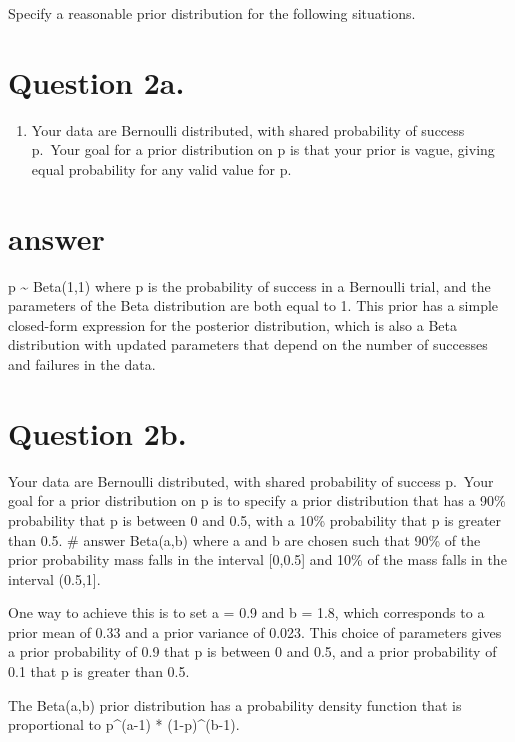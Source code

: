 \documentclass[
]{article}
\providecommand{\tightlist}{%
  \setlength{\itemsep}{0pt}\setlength{\parskip}{0pt}}
\begin{document}
Specify a reasonable prior distribution for the following situations.

\hypertarget{question-2a.}{%
\section{Question 2a.}\label{question-2a.}}

\begin{enumerate}
\def\labelenumi{\alph{enumi}.}
\tightlist
\item
  Your data are Bernoulli distributed, with shared probability of
  success p.~Your goal for a prior distribution on p is that your prior
  is vague, giving equal probability for any valid value for p.~
\end{enumerate}

\hypertarget{answer}{%
\section{answer}\label{answer}}

p \textasciitilde{} Beta(1,1) where p is the probability of success in a
Bernoulli trial, and the parameters of the Beta distribution are both
equal to 1. This prior has a simple closed-form expression for the
posterior distribution, which is also a Beta distribution with updated
parameters that depend on the number of successes and failures in the
data.

\hypertarget{question-2b.}{%
\section{Question 2b.}\label{question-2b.}}

Your data are Bernoulli distributed, with shared probability of success
p.~Your goal for a prior distribution on p is to specify a prior
distribution that has a 90\% probability that p is between 0 and 0.5,
with a 10\% probability that p is greater than 0.5. \# answer Beta(a,b)
where a and b are chosen such that 90\% of the prior probability mass
falls in the interval {[}0,0.5{]} and 10\% of the mass falls in the
interval (0.5,1{]}.

One way to achieve this is to set a = 0.9 and b = 1.8, which corresponds
to a prior mean of 0.33 and a prior variance of 0.023. This choice of
parameters gives a prior probability of 0.9 that p is between 0 and 0.5,
and a prior probability of 0.1 that p is greater than 0.5.

The Beta(a,b) prior distribution has a probability density function that
is proportional to p\^{}(a-1) * (1-p)\^{}(b-1).
\end{document}
